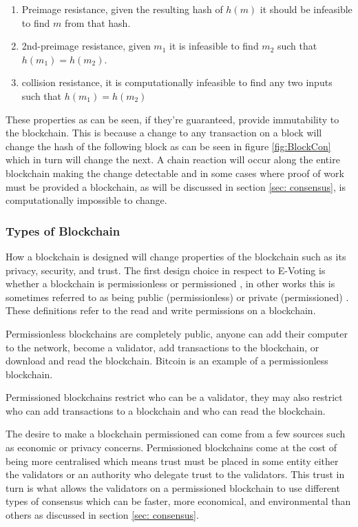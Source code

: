 \documentclass{entcs}
\begin{document}
\begin{enumerate}
    \item Preimage resistance, given the resulting hash of \(h(m)\) it should be infeasible to find \(m\) from that hash. 
    \item 2nd-preimage resistance, given \(m_1\) it is infeasible to find \(m_2\) such that \(h(m_1) = h(m_2)\).
    \item collision resistance, it is computationally infeasible to find any two inputs such that \(h(m_1) = h(m_2)\)
\end{enumerate}

These properties as can be seen, if they're guaranteed, provide immutability to the blockchain. This is because a change to any transaction on a block will change the hash of the following block as can be seen in figure \ref{fig:BlockCon} which in turn will change the next. A chain reaction will occur along the entire blockchain making the change detectable and in some cases where proof of work must be provided a blockchain, as will be discussed in section \ref{sec: consensus}, is computationally impossible to change.

\subsubsection{Types of Blockchain}
How a blockchain is designed will change properties of the blockchain such as its privacy, security, and trust. The first design choice in respect to E-Voting is whether a blockchain is permissionless or permissioned \cite{wust2018need}, in other works this is sometimes referred to as being public (permissionless) or private (permissioned) \cite{blockchainBeginners}. These definitions refer to the read and write permissions on a blockchain. 

Permissionless blockchains are completely public, anyone can add their computer to the network, become a validator, add transactions to the blockchain, or download and read the blockchain. Bitcoin is an example of a permissionless blockchain.

Permissioned blockchains restrict who can be a validator, they may also restrict who can add transactions to a blockchain and who can read the blockchain. 

The desire to make a blockchain permissioned can come from a few sources such as economic or privacy concerns. Permissioned blockchains come at the cost of being more centralised which means trust must be placed in some entity either the validators or an authority who delegate trust to the validators. This trust in turn is what allows the validators on a permissioned blockchain to use different types of consensus which can be faster, more economical, and environmental than others as discussed in section \ref{sec: consensus}.
\end{document}
